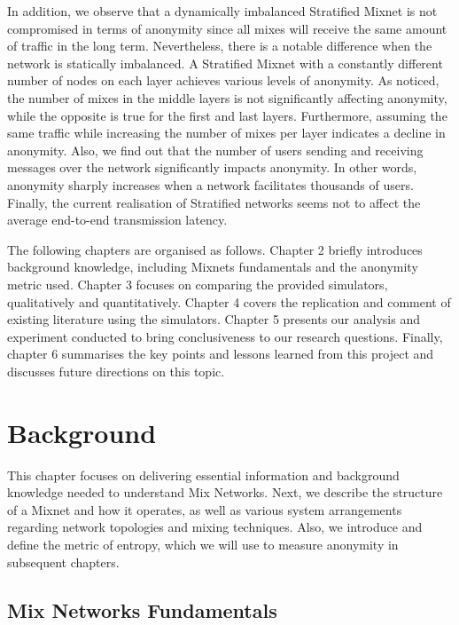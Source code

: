 \documentclass[logo,msc,cyber]{infthesis}   %
\begin{document}
In addition, we observe that a dynamically imbalanced Stratified Mixnet is not
compromised in terms of anonymity since all mixes will receive the same amount
of traffic in the long term. Nevertheless, there is a notable difference when
the network is statically imbalanced. A Stratified Mixnet with a constantly
different number of nodes on each layer achieves various levels of anonymity. As
noticed, the number of mixes in the middle layers is not significantly affecting
anonymity, while the opposite is true for the first and last layers.
Furthermore, assuming the same traffic while increasing the number of mixes per
layer indicates a decline in anonymity. Also, we find out that the number of
users sending and receiving messages over the network significantly impacts
anonymity. In other words, anonymity sharply increases when a network
facilitates thousands of users. Finally, the current realisation of Stratified
networks seems not to affect the average end-to-end transmission latency.

The following chapters are organised as follows. Chapter 2 briefly introduces
background knowledge, including Mixnets fundamentals and the anonymity metric
used. Chapter 3 focuses on comparing the provided simulators, qualitatively and
quantitatively. Chapter 4 covers the replication and comment of existing
literature using the simulators. Chapter 5 presents our analysis and experiment
conducted to bring conclusiveness to our research questions. Finally, chapter 6
summarises the key points and lessons learned from this project and discusses
future directions on this topic.


\chapter{Background}
This chapter focuses on delivering essential information and background
knowledge needed to understand Mix Networks. Next, we describe the structure of
a Mixnet and how it operates, as well as various system arrangements regarding
network topologies and mixing techniques. Also, we introduce and define the
metric of entropy, which we will use to measure anonymity in subsequent chapters.

\section{Mix Networks Fundamentals} 
\end{document}
